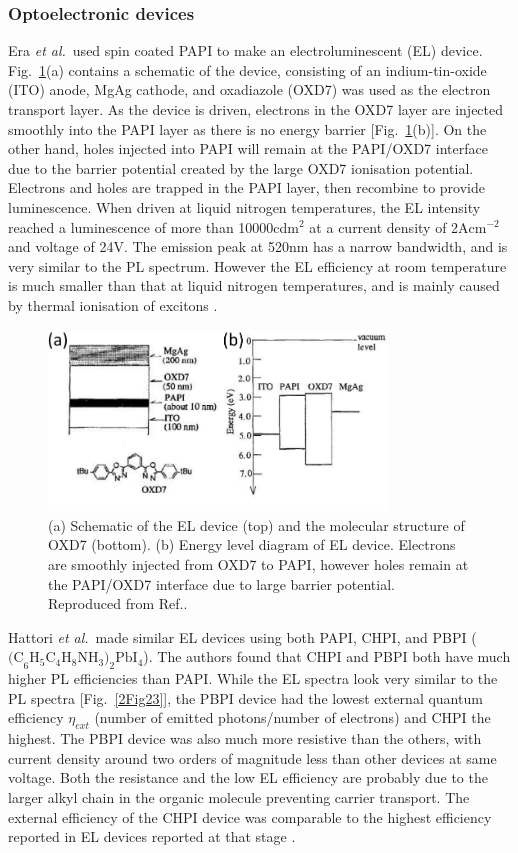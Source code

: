 \subsubsection{Optoelectronic devices}
Era \textit{et al.}\ used spin coated PAPI to make an electroluminescent (EL) device. Fig.\ \ref{2Fig22}(a) contains a schematic of the device, consisting of an indium-tin-oxide (ITO) anode, MgAg cathode, and oxadiazole (OXD7) was used as the electron transport layer. As the device is driven, electrons in the OXD7 layer are injected smoothly into the PAPI layer as there is no energy barrier [Fig.\ \ref{2Fig22}(b)]. On the other hand, holes injected into PAPI will remain at the PAPI/OXD7 interface due to the barrier potential created by the large OXD7 ionisation potential. Electrons and holes are trapped in the PAPI layer, then recombine to provide luminescence. When driven at liquid nitrogen temperatures, the EL intensity reached a luminescence of more than 10000cd$\textrm{m}^2$ at a current density of 2A$\textrm{cm}^{-2}$ and voltage of 24V. The emission peak at 520nm has a narrow bandwidth, and is very similar to the PL spectrum. However the EL efficiency at room temperature is much smaller than that at liquid nitrogen temperatures, and is mainly caused by thermal ionisation of excitons \cite{Era1994}.
\begin{figure}[h!]
\centering
\includegraphics[width=0.8\textwidth]{Fig22}
\caption{(a) Schematic of the EL device (top) and the molecular structure of OXD7 (bottom). (b) Energy level diagram of EL device. Electrons are smoothly injected from OXD7 to PAPI, however holes remain at the PAPI/OXD7 interface due to large barrier potential. Reproduced from Ref.\cite{Era1994}.}
\label{2Fig22}
\end{figure}

Hattori \textit{et al.}\ made similar EL devices using both PAPI, CHPI, and PBPI ($\textrm{(C}_6\textrm{H}_5\textrm{C}_4\textrm{H}_8\textrm{NH}_3)_2\textrm{PbI}_4$). The authors found that CHPI and PBPI both have much higher PL efficiencies than PAPI. While the EL spectra look very similar to the PL spectra [Fig.\ \ref{2Fig23}], the PBPI device had the lowest external quantum efficiency $\eta_{ext}$ (number of emitted photons/number of electrons) and CHPI the highest. The PBPI device was also much more resistive than the others, with current density around two orders of magnitude less than other devices at same voltage. Both the resistance and the low EL efficiency are probably due to the larger alkyl chain in the organic molecule preventing carrier transport. The external efficiency of the CHPI device was comparable to the highest efficiency reported in EL devices reported at that stage \cite{Hattori1996}.

